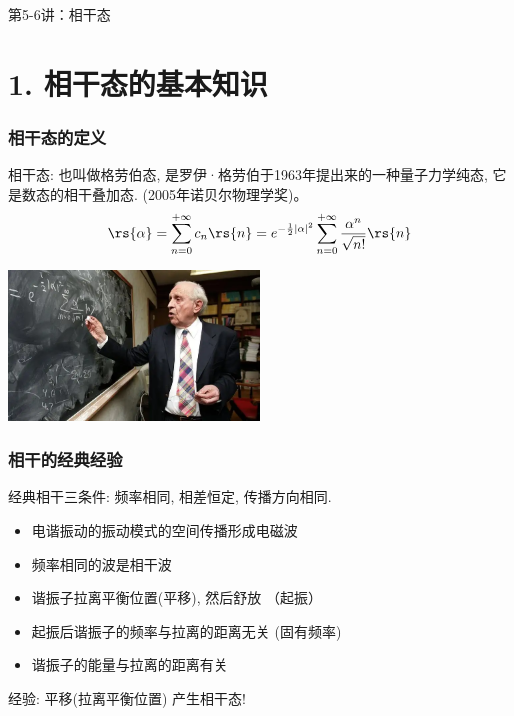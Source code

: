 
\begin{frame} [plain]
    \frametitle{}
    \Background[1] 
    \begin{center}
    {\huge 第5-6讲：相干态}
    \end{center}  
    \addtocounter{framenumber}{-1}   
\end{frame}

\section{1. 相干态的基本知识}

\begin{frame}
 \frametitle{相干态的定义}
 相干态: 也叫做格劳伯态, 是罗伊·格劳伯于1963年提出来的一种量子力学纯态, 它是数态的相干叠加态. (2005年诺贝尔物理学奖)。
 \[ \rs{\alpha} = \sum_{n=0} ^{+\infty} c_n  \rs{n} = e^{-\frac{1}{2}\left|\alpha\right|^2}  \sum_{n=0} ^{+\infty}  \frac{\alpha^n}{\sqrt{n!}} \rs{n} \]
   \begin{center}
        \includegraphics[width=0.5\textwidth]{figs/2022-04-27-11-50-32.png}
   \end{center}
\end{frame}

\begin{frame}
 \frametitle{相干的经典经验}
    经典相干三条件: 频率相同, 相差恒定, 传播方向相同.
 \begin{itemize}
     \item 电谐振动的振动模式的空间传播形成电磁波
     \item 频率相同的波是相干波
     \item 谐振子拉离平衡位置(平移), 然后舒放 （起振）
     \item 起振后谐振子的频率与拉离的距离无关 (固有频率)
     \item 谐振子的能量与拉离的距离有关
 \end{itemize}
    经验: 平移(拉离平衡位置) 产生相干态!    
\end{frame}

